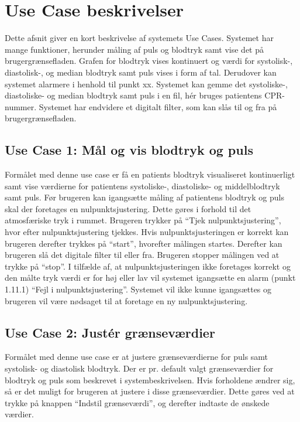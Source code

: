 \section{Use Case beskrivelser}
Dette afsnit giver en kort beskrivelse af systemets Use Cases. Systemet har mange funktioner, herunder måling af puls og blodtryk samt vise det på brugergrænsefladen. Grafen for blodtryk vises kontinuert og værdi for systolisk-, diastolisk-, og median blodtryk samt puls vises i form af tal. Derudover kan systemet alarmere i henhold til punkt xx. Systemet kan gemme det systoliske-, diastoliske- og median blodtryk samt puls i en fil, hér bruges patientens CPR-nummer. Systemet har endvidere et digitalt filter, som kan slås til og fra på brugergrænsefladen. 
\subsection{Use Case 1: Mål og vis blodtryk og puls}
Formålet med denne use case er få en patients blodtryk visualiseret kontinuerligt samt vise værdierne for patientens systoliske-, diastoliske- og middelblodtryk samt puls. Før brugeren kan igangsætte måling af patientens blodtryk og puls skal der foretages en nulpunktsjustering. Dette gøres i forhold til det atmosfæriske tryk i rummet. Brugeren trykker på “Tjek nulpunktsjustering”, hvor efter nulpunktsjustering tjekkes. Hvis nulpunktsjusteringen er korrekt kan brugeren derefter trykkes på “start”, hvorefter målingen startes. Derefter kan brugeren slå det digitale filter til eller fra. Brugeren stopper målingen ved at trykke på “stop”.
I tilfælde af, at nulpunktsjusteringen ikke foretages korrekt og den målte tryk værdi er for høj eller lav vil systemet igangsætte en alarm (punkt 1.11.1) “Fejl i nulpunktsjustering”. Systemet vil ikke kunne igangsættes og brugeren vil være nødsaget til at foretage en ny nulpunktsjustering.

\subsection{Use Case 2: Justér grænseværdier}
Formålet med denne use case er at justere grænseværdierne for puls samt systolisk- og diastolisk blodtryk. Der er pr. default valgt grænseværdier for blodtryk og puls som beskrevet i systembeskrivelsen. Hvis forholdene ændrer sig, så er det muligt for brugeren at justere i disse grænseværdier. Dette gøres ved at trykke på knappen “Indstil grænseværdi”, og derefter indtaste de ønskede værdier. 


